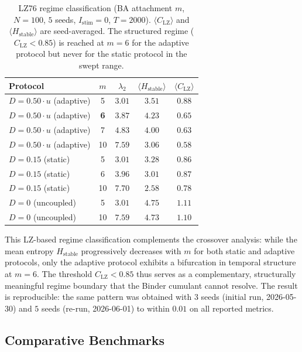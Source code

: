 ﻿\documentclass[11pt]{article}
\begin{document}
\begin{table}[ht]
\centering
\caption{LZ76 regime classification (BA attachment $m$, $N=100$, $5$ seeds, $I_{\mathrm{stim}}=0$, $T=2000$). $\langle C_{\mathrm{LZ}} \rangle$ and $\langle H_{\mathrm{stable}} \rangle$ are seed-averaged. The structured regime ($C_{\mathrm{LZ}} < 0.85$) is reached at $m = 6$ for the adaptive protocol but never for the static protocol in the swept range.}
\label{tab:lz_regime}
\begin{tabular}{lcccc}
\toprule
\textbf{Protocol} & $m$ & $\lambda_2$ & $\langle H_{\mathrm{stable}} \rangle$ & $\langle C_{\mathrm{LZ}} \rangle$ \\
\midrule
$D=0.50\cdot u$ (adaptive) & 5 & $3.01$ & $3.51$ & $0.88$ \\
$D=0.50\cdot u$ (adaptive) & \textbf{6} & $3.87$ & $\mathbf{4.23}$ & $\mathbf{0.65}$ \\
$D=0.50\cdot u$ (adaptive) & 7 & $4.83$ & $4.00$ & $0.63$ \\
$D=0.50\cdot u$ (adaptive) & 10 & $7.59$ & $3.06$ & $0.58$ \\
\midrule
$D=0.15$ (static)          & 5 & $3.01$ & $3.28$ & $0.86$ \\
$D=0.15$ (static)          & 6 & $3.96$ & $3.01$ & $0.87$ \\
$D=0.15$ (static)          & 10 & $7.70$ & $2.58$ & $0.78$ \\
\midrule
$D=0$ (uncoupled)          & 5 & $3.01$ & $4.75$ & $1.11$ \\
$D=0$ (uncoupled)          & 10 & $7.59$ & $4.73$ & $1.10$ \\
\bottomrule
\end{tabular}
\end{table}

This LZ-based regime classification complements the crossover analysis: while the mean entropy $H_{\mathrm{stable}}$ progressively decreases with $m$ for both static and adaptive protocols, only the adaptive protocol exhibits a bifurcation in temporal structure at $m = 6$. The threshold $C_{\mathrm{LZ}} < 0.85$ thus serves as a complementary, structurally meaningful regime boundary that the Binder cumulant cannot resolve. The result is reproducible: the same pattern was obtained with $3$ seeds (initial run, 2026-05-30) and $5$ seeds (re-run, 2026-06-01) to within $0.01$ on all reported metrics.

\subsection{Comparative Benchmarks}
\end{document}
